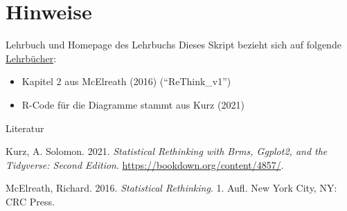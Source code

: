 \documentclass[
  ngerman,
  ignorenonframetext,
]{beamer}
\providecommand{\tightlist}{%
  \setlength{\itemsep}{0pt}\setlength{\parskip}{0pt}}
\newlength{\cslhangindent}
\newenvironment{CSLReferences}[2] %
 {%
  \setlength{\parindent}{0pt}
  \ifodd #1 \everypar{\setlength{\hangindent}{\cslhangindent}}\ignorespaces\fi
  \ifnum #2 > 0
  \setlength{\parskip}{#2\baselineskip}
  \fi
 }%
 {}
\begin{document}
\hypertarget{hinweise}{%
\section{Hinweise}\label{hinweise}}

\begin{frame}{Lehrbuch und Homepage des Lehrbuchs}
\protect\hypertarget{lehrbuch-und-homepage-des-lehrbuchs}{}
Dieses Skript bezieht sich auf folgende
\protect\hyperlink{literatur}{Lehrbücher}:

\begin{itemize}
\tightlist
\item
  Kapitel 2 aus McElreath (2016) (``ReThink\_v1'')
\item
  R-Code für die Diagramme stammt aus Kurz (2021)
\end{itemize}
\end{frame}

\begin{frame}{Literatur}
\protect\hypertarget{literatur}{}
\hypertarget{refs}{}
\begin{CSLReferences}{1}{0}
\leavevmode{}%
Kurz, A. Solomon. 2021. \emph{Statistical Rethinking with Brms, Ggplot2,
and the Tidyverse: {Second} Edition}.
\url{https://bookdown.org/content/4857/}.

\leavevmode{}%
McElreath, Richard. 2016. \emph{Statistical {Rethinking}}. 1. Aufl. {New
York City, NY}: {CRC Press}.

\end{CSLReferences}
\end{frame}
\end{document}
